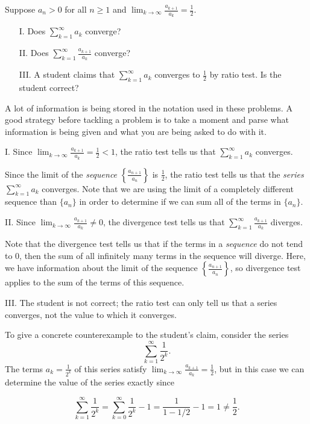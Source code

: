 \documentclass[noauthor]{ximera}
\begin{document}
\begin{problem}
Suppose $a_n>0$ for all $n \geq 1$ and $\lim_{k \rightarrow \infty} \frac{a_{k+1}}{a_k} = \frac{1}{2}.$

\begin{itemize}
\item[I.] Does $\sum_{k=1}^\infty a_k$ converge?
\item[II.] Does $\sum_{k=1}^\infty \frac{a_{k+1}}{a_k}$ converge?
\item[III.] A student claims that $\sum_{k=1}^\infty a_k$ converges to $\frac{1}{2}$ by ratio test. Is the student correct?
\end{itemize}

\begin{freeResponse}
A lot of information is being stored in the notation used in these problems.  A good strategy before tackling a problem is to take a moment and parse what information is being given and what you are being asked to do with it.

I. Since $\lim_{k \rightarrow \infty} \frac{a_{k+1}}{a_k} = \frac{1}{2}<1$, the ratio test tells us that $\sum_{k=1}^\infty a_k$ converges.

\begin{remark}
Since the limit of the \emph{sequence} $\left\{\frac{a_{n+1}}{a_n} \right\}$ is $\frac{1}{2}$, the ratio test tells us that the \emph{series} $\sum_{k=1}^\infty a_k$ converges.  Note that we are using the limit of a completely different sequence than $\{a_n\}$ in order to determine if we can sum all of the terms in $\{a_n\}$.
\end{remark}


II. Since $\lim_{k \rightarrow \infty} \frac{a_{k+1}}{a_k} \neq 0$, the divergence test tells us that $\sum_{k=1}^\infty \frac{a_{k+1}}{a_k}$ diverges.


\begin{remark}
Note that the divergence test tells us that if the terms in a \emph{sequence} do not tend to $0$, then the sum of all infinitely many terms in the sequence will diverge.  Here, we have information about the limit of the sequence $\left\{\frac{a_{n+1}}{a_n} \right\}$, so divergence test applies to the sum of the terms of this sequence.
\end{remark}

III. The student is not correct; the ratio test can only tell us that a series converges, not the value to which it converges. 

To give a concrete counterexample to the student's claim, consider the series 
$$
\sum_{k=1}^\infty \frac{1}{2^k}.
$$
The terms $a_k = \frac{1}{2^k}$ of this series satisfy $\lim_{k \rightarrow \infty} \frac{a_{k+1}}{a_k} = \frac{1}{2}$, but in this case we can determine the value of the series exactly since

$$
\sum_{k=1}^\infty \frac{1}{2^k} = \sum_{k=0}^\infty \frac{1}{2^k} - 1 = \frac{1}{1-1/2} - 1 = 1 \neq \frac{1}{2}.
$$


\end{freeResponse}
\end{problem}
\end{document}
